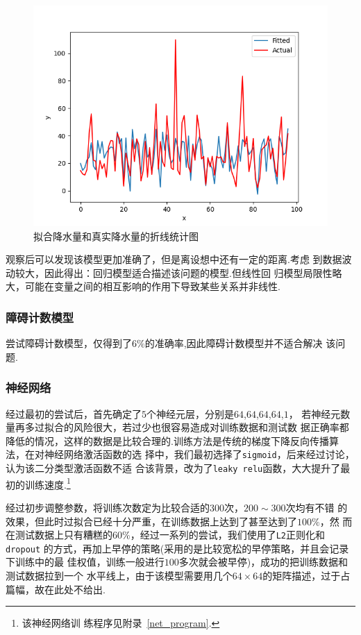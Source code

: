 \documentclass[UTF8, a4paper]{ctexart}
\begin{document}
\begin{figure}[h!]
	\centering
	\includegraphics[scale=0.3]{fit2.png}
	\caption{拟合降水量和真实降水量的折线统计图}
\end{figure}

观察后可以发现该模型更加准确了，但是离设想中还有一定的距离.考虑
到数据波动较大，因此得出：回归模型适合描述该问题的模型.但线性回
归模型局限性略大，可能在变量之间的相互影响的作用下导致某些关系并非线性.

\subsubsection{障碍计数模型}

尝试障碍计数模型，仅得到了$6\%$的准确率,因此障碍计数模型并不适合解决
该问题.

\subsubsection{神经网络}

经过最初的尝试后，首先确定了$5$个神经元层，分别是$64$,$64$,$64$,$64$,$1$，
若神经元数量再多过拟合的风险很大，若过少也很容易造成对训练数据和测试数
据正确率都降低的情况，这样的数据是比较合理的.训练方法是传统的梯度下降反向传播算法，在对神经网络激活函数的选
择中，我们最初选择了\verb+sigmoid+，后来经过讨论，认为该二分类型激活函数不适
合该背景，改为了\verb+leaky relu+函数，大大提升了最初的训练速度.\footnote{该神经网络训
	练程序见附录~\textcolor{red}{\ref{net_program}}.}

经过初步调整参数，将训练次数定为比较合适的$300$次，$200\sim300$次均有不错
的效果，但此时过拟合已经十分严重，在训练数据上达到了甚至达到了$100\%$，然
而在测试数据上只有糟糕的$60\%$，经过一系列的尝试，我们使用了\verb+L2+正则化和\verb+dropout+
的方式，再加上早停的策略(采用的是比较宽松的早停策略，并且会记录下训练中的最
佳权值，训练一般进行$100$多次就会被早停)，成功的把训练数据和测试数据拉到一个
水平线上，由于该模型需要用几个$64\times64$的矩阵描述，过于占篇幅，故在此处不给出.
\end{document}
